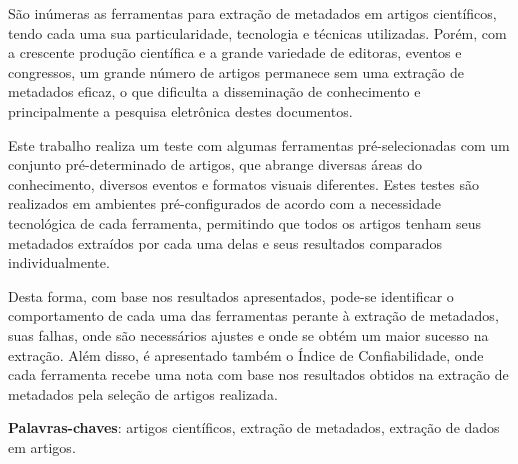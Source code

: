 
\setlength{\absparsep}{18pt} %
\begin{resumo}


São inúmeras as ferramentas para extração de metadados em artigos científicos, tendo cada uma sua particularidade, tecnologia e técnicas utilizadas. Porém, com a crescente produção científica e a grande variedade de editoras, eventos e congressos, um grande número de artigos permanece sem uma extração de metadados eficaz, o que dificulta a disseminação de conhecimento e principalmente a pesquisa eletrônica destes documentos.

Este trabalho realiza um teste com algumas ferramentas pré-selecionadas com um conjunto pré-determinado de artigos, que abrange diversas áreas do conhecimento, diversos eventos e formatos visuais diferentes. Estes testes são realizados em ambientes pré-configurados de acordo com a necessidade tecnológica de cada ferramenta, permitindo que todos os artigos tenham seus metadados extraídos por cada uma delas e seus resultados comparados individualmente. 

Desta forma, com base nos resultados apresentados, pode-se identificar o comportamento de cada uma das ferramentas perante à extração de metadados, suas falhas, onde são necessários ajustes e onde se obtém um maior sucesso na extração. Além disso, é apresentado também o Índice de Confiabilidade, onde cada ferramenta recebe uma nota com base nos resultados obtidos na extração de metadados pela seleção de artigos realizada.

\textbf{Palavras-chaves}: artigos científicos, extração de metadados, extração de dados em artigos.

\end{resumo}

